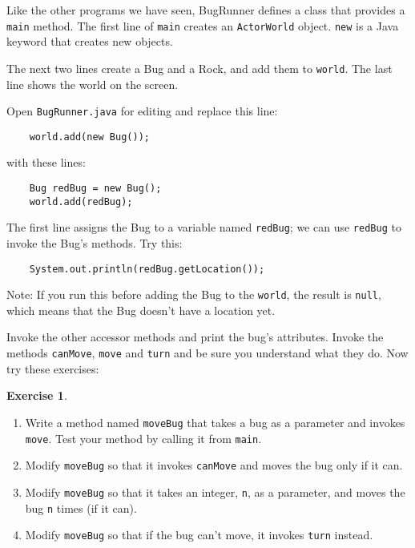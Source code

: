 \documentclass[12pt]{book}
\theoremstyle{definition}
\newtheorem{excz}{Exercise}[chapter]
\newenvironment{exercise}{\bigskip\begin{excz}\mbox{}}{\end{excz}}
\begin{document}
Like the other programs we have seen, BugRunner defines a class
that provides a {\tt main} method.  The first line of {\tt main}
creates an {\tt ActorWorld} object.  {\tt new} is a Java keyword
that creates new objects.

The next two lines create a Bug and a Rock, and add them to {\tt world}.
The last line shows the world on the screen.

Open {\tt BugRunner.java} for editing and replace this line:

\begin{lstlisting}
    world.add(new Bug());
\end{lstlisting}

with these lines:

\begin{lstlisting}
    Bug redBug = new Bug();
    world.add(redBug);
\end{lstlisting}

The first line assigns the Bug to a variable named {\tt redBug};
we can use {\tt redBug} to invoke the Bug's methods.  Try this:

\begin{lstlisting}
    System.out.println(redBug.getLocation());
\end{lstlisting}

Note: If you run this before adding the Bug to the {\tt world}, the result is
{\tt null}, which means that the Bug doesn't have a location yet.

Invoke the other accessor methods and print the bug's attributes.
Invoke the methods {\tt canMove}, {\tt move} and {\tt turn} and
be sure you understand what they do.  Now try these exercises:

\begin{exercise}

\begin{enumerate}

\item Write a method named {\tt moveBug} that takes a bug as a parameter
and invokes {\tt move}.  Test your method by calling it from {\tt main}.

\item Modify {\tt moveBug} so that it invokes {\tt canMove} and moves
the bug only if it can.

\item Modify {\tt moveBug} so that it takes an integer, {\tt n}, as a
parameter, and moves the bug {\tt n} times (if it can).

\item Modify {\tt moveBug} so that if the bug can't move, it invokes
{\tt turn} instead.

\end{enumerate}
\end{exercise}
\end{document}

